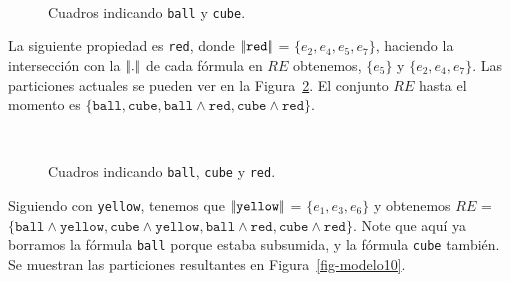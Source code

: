 \begin{figure}[ht]
\begin{center}
\\[0pt]
\caption{Cuadros indicando \texttt{ball} y \texttt{cube}.}
\label{fig-modelo4}
\end{center}
\end{figure}
La siguiente propiedad es \texttt{red}, donde  
$|\!|\texttt{red}|\!|$ = $\{e_2, e_4, e_5, e_7\}$, haciendo la intersecci\'on con la $|\!|.|\!|$ de cada f\'ormula en $RE$ obtenemos, 
$\{e_5\}$ y $\{e_2, e_4, e_7\}$. Las particiones actuales se pueden ver en la Figura~\ref{fig-modelo9}. El conjunto $RE$ hasta el momento es $\{\texttt{ball}, \texttt{cube}, \texttt{ball} \wedge \texttt{red}, \texttt{cube} \wedge \texttt{red}\}$.

\begin{figure}[ht]
\begin{center}
\\[0pt]
\caption{Cuadros indicando \texttt{ball}, \texttt{cube} y \texttt{red}.}
\label{fig-modelo9}
\end{center}
\end{figure}
%
Siguiendo con \texttt{yellow}, tenemos que $|\!|\texttt{yellow}|\!|$ = $\{e_1, e_3, e_6\}$ y obtenemos $RE$ = $\{\texttt{ball} \wedge \texttt{yellow}, 
\texttt{cube} \wedge \texttt{yellow}, \texttt{ball} \wedge \texttt{red}, \texttt{cube} \wedge \texttt{red}\}$. 
Note que aqu\'i ya borramos la f\'ormula \texttt{ball} porque estaba subsumida, y la f\'ormula \texttt{cube} tambi\'en. Se muestran las particiones resultantes en Figura~\ref{fig-modelo10}.

